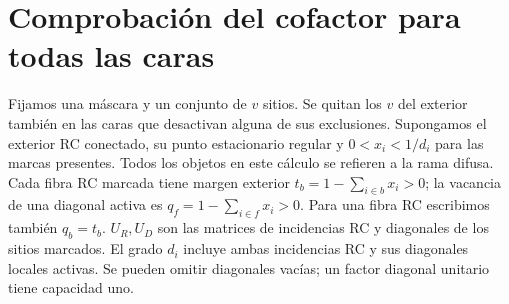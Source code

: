\section{Comprobación del cofactor para todas las caras}
Fijamos una máscara y un conjunto de $v$ sitios. Se quitan los $v$ del exterior
también en las caras que desactivan alguna de sus exclusiones. Supongamos el exterior
RC conectado, su punto estacionario regular y $0<x_i<1/d_i$ para las marcas presentes.
Todos los objetos en este cálculo se refieren a la rama difusa. Cada fibra RC marcada
tiene margen exterior $t_b=1-\sum_{i\in b}x_i>0$; la vacancia de una diagonal activa
es $q_f=1-\sum_{i\in f}x_i>0$. Para una fibra RC escribimos también $q_b=t_b$.
$U_R,U_D$ son las matrices de incidencias RC y diagonales de los sitios marcados.
El grado $d_i$ incluye ambas incidencias RC y sus diagonales locales activas.
Se pueden omitir diagonales vacías; un factor diagonal unitario tiene capacidad uno.
